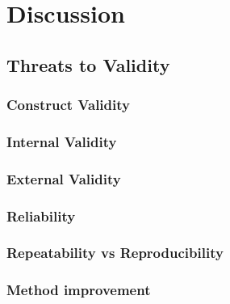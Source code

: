 \chapter{Discussion}\label{chapter:Discussion}

\section{Threats to Validity}  

\subsection{Construct Validity}

\subsection{Internal Validity}

\subsection{External Validity}

\subsection{Reliability}

\subsection{Repeatability vs Reproducibility}

\subsection{Method improvement}
